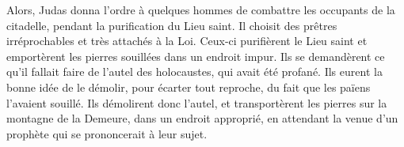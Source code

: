 Alors, Judas donna l’ordre à quelques hommes de combattre les occupants de la citadelle,
	pendant la purification du Lieu saint.
Il choisit des prêtres irréprochables et très attachés à la Loi.
Ceux-ci purifièrent le Lieu saint
	et emportèrent les pierres souillées dans un endroit impur.
Ils se demandèrent ce qu’il fallait faire de l’autel des holocaustes,
	qui avait été profané.
Ils eurent la bonne idée de le démolir, pour écarter tout reproche,
	du fait que les païens l’avaient souillé.
Ils démolirent donc l’autel, et transportèrent les pierres sur la montagne de la Demeure,
	dans un endroit approprié,
	en attendant la venue d’un prophète qui se prononcerait à leur sujet.
